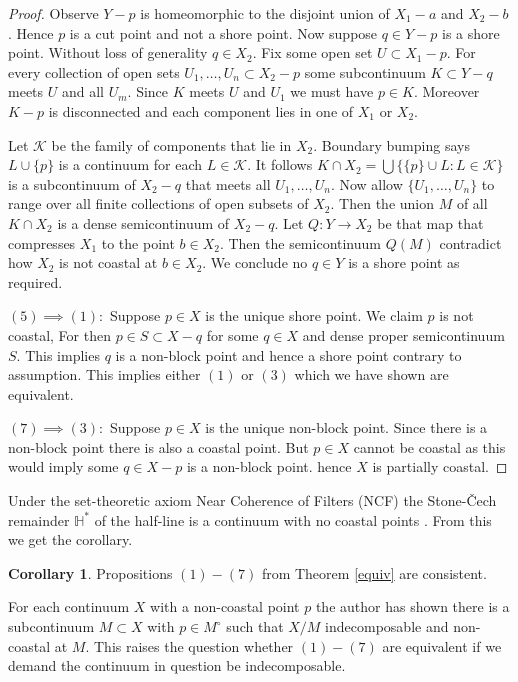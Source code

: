 \documentclass[12pt]{article}
\theoremstyle{plain}
\theoremstyle{definition}
\newtheorem{corollary}[theorem]{Corollary}
\newcounter{claim5counter}
\newcommand{\HH}{\ensuremath{\mathbb H}}
\newcommand{\0}{\ensuremath{\varnothing}}
\newcommand{\cK}{\ensuremath{\mathcal K}}
\begin{document}
\begin{proof}
Observe $Y - p$ is homeomorphic to the disjoint union of $X_1 - a$ and $X_2 - b$. 
Hence $p$ is a cut point and not a shore point.
Now suppose $q \in Y-p$ is a shore point.
Without loss of generality $q \in X_2$.
Fix some open set $U \subset X_1 - p$.
For every collection of open sets $U_1, \ldots , U_n \subset X_2-p$ some subcontinuum $K \subset  Y-q$ meets $U$ and all $U_m$.
Since $K$ meets $U$ and $U_1$ we must have $p \in K$.
Moreover $K-p$ is disconnected and each component lies in one of $X_1$ or $X_2$.

Let $\cK$ be the family of components that lie in $X_2$.
Boundary bumping says $L \cup \{p\}$ is a continuum for each $L \in \cK$.
It follows $K \cap X_2 = \bigcup \big \{ \{p\} \cup L : L \in \cK \big \}$ is a subcontinuum of $X_2 - q$ that meets all $U_1,\ldots , U_n$.
Now allow $\{U_1,\ldots , U_n\}$ to range over all finite collections of open subsets of $X_2$.
Then the union $M$ of all $K \cap X_2$ is a dense semicontinuum of $X_2 - q$.
Let $Q: Y \to X_2$ be that map that compresses $X_1$ to the point $b \in X_2$.
Then the semicontinuum $Q(M)$ contradict how $X_2$ is not coastal at $b \in X_2$.
We conclude no $q \in Y$ is a shore point as required.

$(5) \implies (1):$ Suppose $p \in X$ is the unique shore point.
We claim $p$ is not coastal,
For then $p \in S \subset X-q$ for some $q \in X$ and dense proper semicontinuum $S$.
This implies $q$ is a non-block point and hence a shore point contrary to assumption.
This implies either $(1)$ or $(3)$ which we have shown are equivalent.


$(7) \implies (3):$ Suppose $p \in X$ is the unique non-block point.
Since there is a non-block point there is also a coastal point.
But $p \in X$ cannot be coastal as this would imply some $q \in X-p$ is a non-block point.
hence $X$ is partially coastal.


\end{proof}

Under the set-theoretic axiom Near Coherence of Filters (NCF) the Stone-\v Cech remainder $\HH^*$ 
of the half-line is a continuum with no coastal points \cite{Me2}. From this we get the corollary.

\begin{corollary}
Propositions $(1)-(7)$ from Theorem \ref{equiv} are consistent.
\end{corollary}


For each continuum $X$ with a non-coastal point $p$ the author has shown \cite{Me1} there is a subcontinuum $M \subset X$ with $p \in M^\circ$
such that $X/M$ indecomposable and non- coastal at $M$.  
This raises the question whether $(1)-(7)$ are equivalent if we demand the continuum in question be indecomposable.
\end{document}
